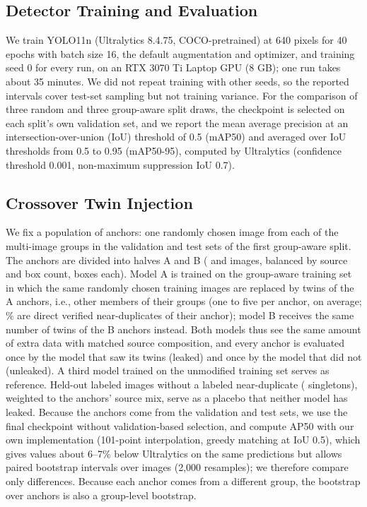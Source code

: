\documentclass[conference,a4paper]{IEEEtran}
\begin{document}
\subsection{Detector Training and Evaluation}
We train YOLO11n \cite{jocher2024yolo11} (Ultralytics 8.4.75, COCO-pretrained) at 640 pixels for 40 epochs with batch size 16, the default augmentation and optimizer, and training seed 0 for every run, on an RTX 3070 Ti Laptop GPU (8 GB); one run takes about 35 minutes. We did not repeat training with other seeds, so the reported intervals cover test-set sampling but not training variance. For the comparison of three random and three group-aware split draws, the checkpoint is selected on each split's own validation set, and we report the mean average precision at an intersection-over-union (IoU) threshold of 0.5 (mAP50) and averaged over IoU thresholds from 0.5 to 0.95 (mAP50-95), computed by Ultralytics (confidence threshold 0.001, non-maximum suppression IoU 0.7).

\subsection{Crossover Twin Injection}
We fix a population of anchors: one randomly chosen image from each of the \InjAnchors{} multi-image groups in the validation and test sets of the first group-aware split. The anchors are divided into halves A and B (\InjA{} and \InjB{} images, balanced by source and box count, \InjBoxesHalf{} boxes each). Model A is trained on the group-aware training set in which the same \InjTwins{} randomly chosen training images are replaced by \InjTwins{} twins of the A anchors, i.e., other members of their groups (one to five per anchor, \TwinMean{} on average; \TwinDirectPct\% are direct verified near-duplicates of their anchor); model B receives the same number of twins of the B anchors instead. Both models thus see the same amount of extra data with matched source composition, and every anchor is evaluated once by the model that saw its twins (leaked) and once by the model that did not (unleaked). A third model trained on the unmodified training set serves as reference. Held-out labeled images without a labeled near-duplicate (\NPlacebo{} singletons), weighted to the anchors' source mix, serve as a placebo that neither model has leaked. Because the anchors come from the validation and test sets, we use the final checkpoint without validation-based selection, and compute AP50 with our own implementation (101-point interpolation, greedy matching at IoU 0.5), which gives values about 6--7\% below Ultralytics on the same predictions but allows paired bootstrap intervals over images (2,000 resamples); we therefore compare only differences. Because each anchor comes from a different group, the bootstrap over anchors is also a group-level bootstrap.
\end{document}
